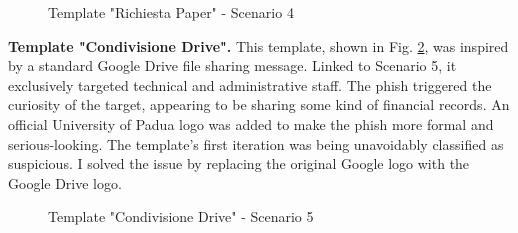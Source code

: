 \documentclass[a4paper]{article}
\begin{document}
\begin{figure}[H]
	\centering
	\caption{Template "Richiesta Paper" - Scenario 4}
	\label{template-s4b1}
\end{figure}

\newpage

\noindent
\textbf{Template "Condivisione Drive".} This template, shown in Fig. \ref{template-s5b1}, was inspired by a standard Google Drive file sharing message. Linked to Scenario 5, it exclusively targeted technical and administrative staff. The phish triggered the curiosity of the target, appearing to be sharing some kind of financial records. An official University of Padua logo was added to make the phish more formal and serious-looking. The template's first iteration was being unavoidably classified as suspicious. I solved the issue by replacing the original Google logo with the Google Drive logo.

\hypertarget{template-s5b1}{}

\bigskip

\begin{figure}[H]
	\centering
	\caption{Template "Condivisione Drive" - Scenario 5}
	\label{template-s5b1}
\end{figure}
\end{document}
